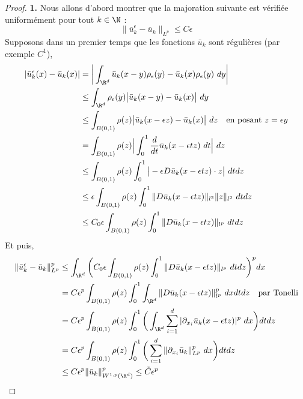 \begin{proof}
    \vspace{1em}
    \textbf{1.}
    Nous allons d'abord montrer que la majoration suivante est vérifiée uniformément pour tout $k \in \N$ :
    $$\| \bar{u}_k^{\epsilon} - \bar{u}_k \|_{L^p} \leq C\epsilon $$
    Supposons dans un premier temps que les fonctions $\bar{u}_k$ sont régulières (par exemple $C^1$),
    \begin{equation*}
    \begin{split}
        |\bar{u}_k^{\epsilon}(x) - \bar{u}_k(x)| &= \bigg| \int_{\R^d} \bar{u}_k(x - y)\rho_{\epsilon}(y) - \bar{u}_k(x)\rho_{\epsilon}(y) \ dy \bigg| \\
        &\leq \int_{\R^d} \rho_{\epsilon}(y) \big| \bar{u}_k(x - y) - \bar{u}_k(x) \big| \ dy \\
        &\leq \int_{B(0,1)} \rho(z) \big| \bar{u}_k(x - \epsilon z) - \bar{u}_k(x) \big| \ dz \quad \text{en posant } z = \epsilon y \\ 
        &= \int_{B(0,1)} \rho(z) \Big| \int_{0}^{1} \frac{d}{dt} \bar{u}_k(x - \epsilon t z) \ dt \Big| \ dz \\
        &\leq \int_{B(0,1)} \rho(z) \int_{0}^{1} \big| -\epsilon D \bar{u}_k(x - \epsilon t z) \cdot z \big| \ dt dz \\
        &\leq \epsilon \int_{B(0,1)} \rho(z) \int_{0}^{1} \|D \bar{u}_k(x - \epsilon t z)\|_{l^2} \| z \|_{l^2} \ dt dz \\
        &\leq C_0 \epsilon \int_{B(0,1)} \rho(z) \int_{0}^{1} \|D \bar{u}_k(x - \epsilon t z)\|_{l^p} \ dt dz
    \end{split}
    \end{equation*}
    Et puis,
    \begin{equation*}
    \begin{split}
        \| \bar{u}_k^{\epsilon} - \bar{u}_k \|_{L^p}^p &\leq  \int_{\R^d} \bigg(C_0 \epsilon \int_{B(0,1)} \rho(z) \int_{0}^{1} \| D \bar{u}_k(x - \epsilon t z) \|_{l^p} \ dt dz \bigg)^p dx \\
        &= C \epsilon^p \int_{B(0,1)} \rho(z) \int_{0}^{1} \int_{\R^d} \| D \bar{u}_k(x - \epsilon t z) \|_{l^p}^p \ dx dt dz \quad \text{par Tonelli} \\
        &= C \epsilon^p \int_{B(0,1)} \rho(z) \int_{0}^{1} \bigg( \int_{\R^d} \sum_{i=1}^{d} |\partial_{x_i} \bar{u}_k(x - \epsilon t z)|^p \ dx \bigg) dt dz \\
        &= C \epsilon^p \int_{B(0,1)} \rho(z) \int_{0}^{1} \bigg( \sum_{i=1}^{d}  \| \partial_{x_i} \bar{u}_k \|_{L^p}^p \ dx \bigg) dt dz \\
        &\leq C \epsilon^p \| \bar{u}_k \|_{W^{1,p}(\R^d)}^p \leq \tilde{C} \epsilon^p
    \end{split}
    \end{equation*}


\end{proof}
